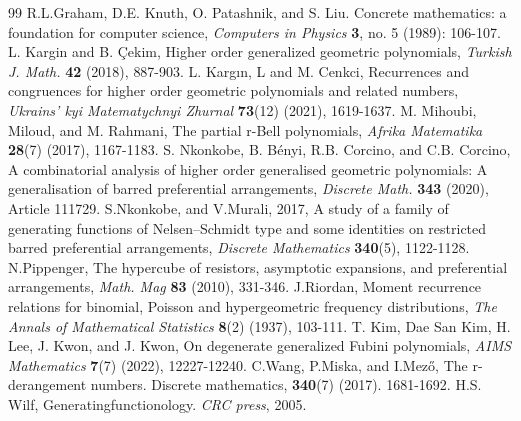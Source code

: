 \documentclass[12pt]{amsart}
\newtheorem{proof 1}{proof 1}
\begin{document}
\begin{thebibliography}{99}
R.L.Graham, D.E.  Knuth, O. Patashnik, and S. Liu. Concrete mathematics: a foundation for computer science, \textit{Computers in Physics} \textbf{3}, no. 5 (1989): 106-107.
 L. Kargin and B. \c{C}ekim, Higher order generalized geometric polynomials,
\textit{Turkish J. Math.} {\bf42} (2018), {887-903}.
  L. Kargın, L and M. Cenkci, Recurrences and congruences for higher order geometric polynomials and related numbers, \textit{Ukrains’ kyi Matematychnyi Zhurnal} \textbf{73}(12) (2021), 1619-1637.
 M. Mihoubi, Miloud, and M. Rahmani, The partial r-Bell polynomials,  \textit{Afrika Matematika} \textbf{28}(7) (2017), 1167-1183.
  S. Nkonkobe, B. B{\'e}nyi, R.B. Corcino,  and C.B. Corcino, A combinatorial analysis of higher order generalised geometric polynomials: A generalisation of barred preferential arrangements, \textit{Discrete Math.}
{\bf343} (2020), Article 111729.
S.Nkonkobe, and V.Murali, 2017, A study of a family of generating functions of Nelsen–Schmidt type and some identities on restricted barred preferential arrangements, \textit{Discrete Mathematics} \textbf{340}(5), 1122-1128.
 N.Pippenger,
The hypercube of resistors, asymptotic expansions, and preferential arrangements, \textit{Math. Mag} {\bf83} (2010), 331-346.
J.Riordan, Moment recurrence relations for binomial, Poisson and hypergeometric frequency distributions, \textit{The Annals of Mathematical Statistics} \textbf{8}(2) (1937), 103-111.
T. Kim, Dae San Kim, H. Lee, J. Kwon, and J. Kwon, On degenerate generalized Fubini polynomials, \textit{AIMS Mathematics} \textbf{7}(7) (2022), 12227-12240.
C.Wang, P.Miska, and I.Mező, The r-derangement numbers. Discrete mathematics, \textbf{340}(7) (2017). 1681-1692.
H.S. Wilf,  Generatingfunctionology. \textit{CRC press}, 2005.
 	\end{thebibliography}\fi
\end{document}
